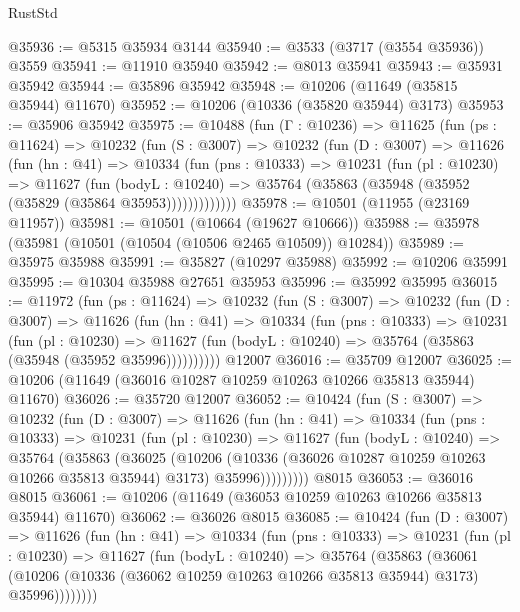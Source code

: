 \begin{lexlean}{RustStd}
\begin{coremodule}
@35936 := @5315 @35934 @3144
@35940 := @3533 (@3717 (@3554 @35936)) @3559
@35941 := @11910 @35940
@35942 := @8013 @35941
@35943 := @35931 @35942
@35944 := @35896 @35942
@35948 := @10206 (@11649 (@35815 @35944) @11670)
@35952 := @10206 (@10336 (@35820 @35944) @3173)
@35953 := @35906 @35942
@35975 := @10488
    (fun (Γ : @10236) =>
    @11625
      (fun (ps : @11624) =>
      @10232
        (fun (S : @3007) =>
        @10232
          (fun (D : @3007) =>
          @11626
            (fun (hn : @41) =>
            @10334
              (fun (pns : @10333) =>
              @10231
                (fun (pl : @10230) =>
                @11627
                  (fun (bodyL : @10240) =>
                  @35764 (@35863 (@35948 (@35952 (@35829 (@35864 @35953)))))))))))))
@35978 := @10501 (@11955 (@23169 @11957))
@35981 := @10501 (@10664 (@19627 @10666))
@35988 := @35978 (@35981 (@10501 (@10504 (@10506 @2465 @10509)) @10284))
@35989 := @35975 @35988
@35991 := @35827 (@10297 @35988)
@35992 := @10206 @35991
@35995 := @10304 @35988 @27651 @35953
@35996 := @35992 @35995
@36015 := @11972
    (fun (ps : @11624) =>
    @10232
      (fun (S : @3007) =>
      @10232
        (fun (D : @3007) =>
        @11626
          (fun (hn : @41) =>
          @10334
            (fun (pns : @10333) =>
            @10231
              (fun (pl : @10230) =>
              @11627 (fun (bodyL : @10240) => @35764 (@35863 (@35948 (@35952 @35996))))))))))
    @12007
@36016 := @35709 @12007
@36025 := @10206 (@11649 (@36016 @10287 @10259 @10263 @10266 @35813 @35944) @11670)
@36026 := @35720 @12007
@36052 := @10424
    (fun (S : @3007) =>
    @10232
      (fun (D : @3007) =>
      @11626
        (fun (hn : @41) =>
        @10334
          (fun (pns : @10333) =>
          @10231
            (fun (pl : @10230) =>
            @11627
              (fun (bodyL : @10240) =>
              @35764
                (@35863
                  (@36025
                    (@10206
                      (@10336 (@36026 @10287 @10259 @10263 @10266 @35813 @35944) @3173)
                      @35996)))))))))
    @8015
@36053 := @36016 @8015
@36061 := @10206 (@11649 (@36053 @10259 @10263 @10266 @35813 @35944) @11670)
@36062 := @36026 @8015
@36085 := @10424
    (fun (D : @3007) =>
    @11626
      (fun (hn : @41) =>
      @10334
        (fun (pns : @10333) =>
        @10231
          (fun (pl : @10230) =>
          @11627
            (fun (bodyL : @10240) =>
            @35764
              (@35863
                (@36061
                  (@10206 (@10336 (@36062 @10259 @10263 @10266 @35813 @35944) @3173) @35996))))))))

\end{coremodule}
\end{lexlean}
